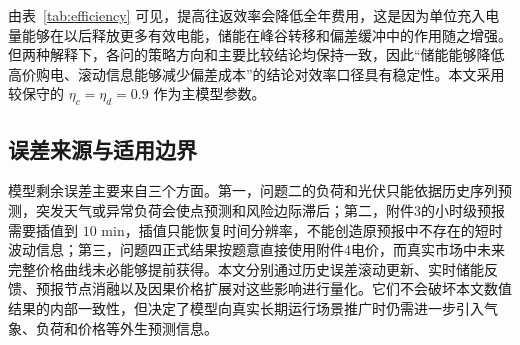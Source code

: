 由表~\ref{tab:efficiency} 可见，提高往返效率会降低全年费用，这是因为单位充入电量能够在以后释放更多有效电能，储能在峰谷转移和偏差缓冲中的作用随之增强。但两种解释下，各问的策略方向和主要比较结论均保持一致，因此“储能能够降低高价购电、滚动信息能够减少偏差成本”的结论对效率口径具有稳定性。本文采用较保守的 $\eta_c=\eta_d=0.9$ 作为主模型参数。

\subsection{误差来源与适用边界}

模型剩余误差主要来自三个方面。第一，问题二的负荷和光伏只能依据历史序列预测，突发天气或异常负荷会使点预测和风险边际滞后；第二，附件3的小时级预报需要插值到 $10$ min，插值只能恢复时间分辨率，不能创造原预报中不存在的短时波动信息；第三，问题四正式结果按题意直接使用附件4电价，而真实市场中未来完整价格曲线未必能够提前获得。本文分别通过历史误差滚动更新、实时储能反馈、预报节点消融以及因果价格扩展对这些影响进行量化。它们不会破坏本文数值结果的内部一致性，但决定了模型向真实长期运行场景推广时仍需进一步引入气象、负荷和价格等外生预测信息。

